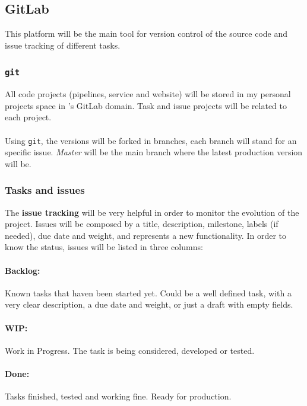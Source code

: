 \subsection{GitLab}

This platform will be the main tool for version control of the source code and issue tracking of different tasks.

\subsubsection*{\texttt{git}}

All code projects (pipelines, service and website) will be stored in my personal projects space in \company's GitLab domain. Task and issue projects will be related to each project.
\\\\
Using \texttt{git}, the versions will be forked in branches, each branch will stand for an specific issue. \textit{Master} will be the main branch where the latest production version will be.

\subsubsection*{Tasks and issues}

The \textbf{issue tracking} will be very helpful in order to monitor the evolution of the project. Issues will be composed by a title, description, milestone, labels (if needed), due date and weight, and represents a new functionality. In order to know the status, issues will be listed in three columns:

\paragraph*{Backlog:}

Known tasks that haven been started yet. Could be a well defined task, with a very clear description, a due date and weight, or just a draft with empty fields.

\paragraph*{WIP:}

Work in Progress. The task is being considered, developed or tested.

\paragraph*{Done:}

Tasks finished, tested and working fine. Ready for production.
